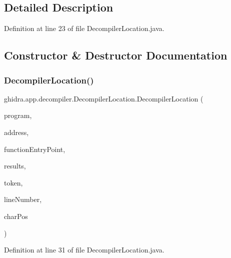 \subsection{Detailed Description}


Definition at line 23 of file Decompiler\+Location.\+java.



\subsection{Constructor \& Destructor Documentation}
\mbox{\label{classghidra_1_1app_1_1decompiler_1_1_decompiler_location_a5c86c9169222bc1b6e57e42cfe5bb80c}} 
\subsubsection{\texorpdfstring{DecompilerLocation()}{DecompilerLocation()}\hspace{0.1cm}{\footnotesize\ttfamily [1/2]}}
{\footnotesize\ttfamily ghidra.\+app.\+decompiler.\+Decompiler\+Location.\+Decompiler\+Location (\begin{DoxyParamCaption}\item[{Program}]{program,  }\item[{\mbox{\hyperlink{class_address}{Address}}}]{address,  }\item[{\mbox{\hyperlink{class_address}{Address}}}]{function\+Entry\+Point,  }\item[{\mbox{\hyperlink{classghidra_1_1app_1_1decompiler_1_1_decompile_results}{Decompile\+Results}}}]{results,  }\item[{\mbox{\hyperlink{classghidra_1_1app_1_1decompiler_1_1_clang_token}{Clang\+Token}}}]{token,  }\item[{int}]{line\+Number,  }\item[{int}]{char\+Pos }\end{DoxyParamCaption})\hspace{0.3cm}{\ttfamily [inline]}}



Definition at line 31 of file Decompiler\+Location.\+java.

